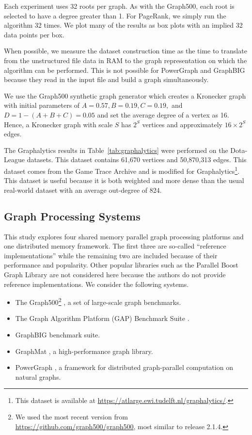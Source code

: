 \documentclass[conference]{IEEEtran}
\begin{document}
Each experiment uses 32 roots per graph. As with the Graph500, each root is selected to have a degree greater than 1. For PageRank, we simply run the algorithm 32 times. We plot many of the results as box plots with an implied 32 data points per box.

When possible, we measure the dataset construction time as the time to translate from the unstructured file data in RAM to the graph representation on which the algorithm can be performed. This is not possible for PowerGraph and GraphBIG because they read in the input file and build a graph simultaneously.

We use the Graph500 synthetic graph generator which creates a Kronecker graph \cite{Leskovec:2010:Kronecker} with initial parameters of $A = 0.57, B = 0.19, C = 0.19,$ and $D = 1-(A+B+C) = 0.05$ and set the average degree of a vertex as 16. Hence, a Kronecker graph with scale $S$ has $2^S$ vertices and approximately $16 \times 2^S$ edges.

The Graphalytics results in Table~\ref{tab:graphalytics} were performed on the Dota-League datasets. This dataset contains 61,670 vertices and 50,870,313 edges. This dataset comes from the Game Trace Archive\cite{Guo:2012:GTA} and is modified for Graphalytics\footnote{This dataset is available at \url{https://atlarge.ewi.tudelft.nl/graphalytics/}.}. This dataset is useful because it is both weighted and more dense than the usual real-world dataset with an average out-degree of 824.

\subsection{Graph Processing Systems}

This study explores four shared memory parallel graph processing platforms and one distributed memory framework. The first three are so-called ``reference implementations'' while the remaining two are included because of their performance and popularity. Other popular libraries such as the Parallel Boost Graph Library \cite{Gregor:2005:PBGL} are not considered here because the authors do not provide reference implementations. We consider the following systems.
\begin{itemize}
	\item The Graph500\footnote{We used the most recent version from \url{https://github.com/graph500/graph500}, most similar to release 2.1.4.} \cite{Murphy:2010:Graph500}, a set of large-scale graph benchmarks.
	\item The Graph Algorithm Platform (GAP) Benchmark Suite \cite{Beamer:2015:GAPBench}.
	\item GraphBIG \cite{Nai:2015:Graphbig} benchmark suite.
	\item GraphMat \cite{Sundaram:2015:GraphMat}, a high-performance graph library.
	\item PowerGraph \cite{Gonzalez:2012:Powergraph}, a framework for distributed graph-parallel computation on natural graphs.
\end{itemize}
\end{document}
